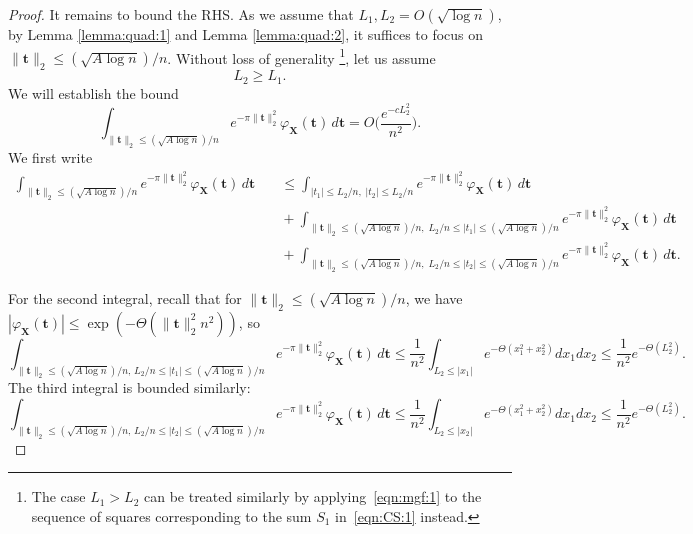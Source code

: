 \documentclass[reqno]{amsart}
\newcommand\BMt{{\bm t}}
\newcommand\BMX{{\bm X}}
\theoremstyle{plain}
\theoremstyle{definition}
\begin{document}
\begin{proof}
It remains to bound the RHS. As we assume that $L_{1}, L_{2} = O(\sqrt{\log n})$, by Lemma \ref{lemma:quad:1} and Lemma \ref{lemma:quad:2}, it suffices to focus on $\|\BMt\|_{2} \le (\sqrt{A\log n})/n$. Without loss of generality \footnote{The case $L_{1} > L_{2}$ can be treated similarly by applying~\eqref{eqn:mgf:1} to the sequence of squares corresponding to the sum $S_{1}$ in~\eqref{eqn:CS:1} instead.}, let us assume
\[
L_{2} \ge L_{1}.
\]
We will establish the bound
\[
\int_{\|\BMt\|_{2} \le (\sqrt{A\log n})/n} e^{-\pi  \|\BMt\|_{2}^{2}} \varphi_{\BMX}(\BMt) \, d\BMt = O\Big( \frac{e^{-c L_{2}^{2}}}{n^{2}} \Big).
\]
We first write
\begin{align*}
\int_{\|\BMt\|_{2} \le (\sqrt{A\log n})/n} e^{-\pi  \|\BMt\|_{2}^{2}} \varphi_{\BMX}(\BMt) \, d\BMt &\quad \le \int_{|t_{1}| \le L_{2}/n, \; |t_{2}| \le L_{2}/n} e^{-\pi  \|\BMt\|_{2}^{2}} \varphi_{\BMX}(\BMt) \, d\BMt \\
&\quad + \int_{\|\BMt\|_{2} \le (\sqrt{A\log n})/n, \; L_{2}/n \le |t_{1}| \le (\sqrt{A\log n})/n} e^{-\pi  \|\BMt\|_{2}^{2}} \varphi_{\BMX}(\BMt) \, d\BMt \\
&\quad + \int_{\|\BMt\|_{2} \le (\sqrt{A\log n})/n, \; L_{2}/n \le |t_{2}| \le (\sqrt{A\log n})/n} e^{-\pi  \|\BMt\|_{2}^{2}} \varphi_{\BMX}(\BMt) \, d\BMt.
\end{align*}

For the second integral, recall that for $\|\BMt\|_{2} \le (\sqrt{A\log n})/n$, we have $|\varphi_{\BMX}(\BMt)| \le \exp(-\Theta(\|\BMt\|_{2}^{2}n^{2}))$, so
\[
\int_{\|\BMt\|_{2} \le (\sqrt{A\log n})/n, \, L_{2}/n\le |t_{1}| \le (\sqrt{A\log n})/n}
 e^{-\pi  \|\BMt\|_{2}^{2}} \varphi_{\BMX}(\BMt) \, d\BMt
 \le \frac{1}{n^{2}}\int_{L_{2}\le |x_{1}|} e^{-\Theta(x_{1}^{2} + x_{2}^{2})} dx_{1}dx_{2}
 \le \frac{1}{n^{2}}e^{-\Theta(L_{2}^{2})}.
\]
The third integral is bounded similarly:
\[
\int_{\|\BMt\|_{2} \le (\sqrt{A\log n})/n, \, L_{2}/n\le |t_{2}| \le (\sqrt{A\log n})/n}
 e^{-\pi  \|\BMt\|_{2}^{2}} \varphi_{\BMX}(\BMt) \, d\BMt
 \le \frac{1}{n^{2}}\int_{L_{2}\le |x_{2}|} e^{-\Theta(x_{1}^{2} + x_{2}^{2})} dx_{1}dx_{2}
 \le \frac{1}{n^{2}}e^{-\Theta(L_{2}^{2})}.
\]


\end{proof}
\end{document}
